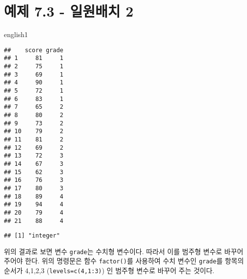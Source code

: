 \documentclass[
]{book}
\newenvironment{Shaded}{\begin{snugshade}}{\end{snugshade}}
\newcommand{\AttributeTok}[1]{\textcolor[rgb]{0.77,0.63,0.00}{#1}}
\newcommand{\DecValTok}[1]{\textcolor[rgb]{0.00,0.00,0.81}{#1}}
\newcommand{\FunctionTok}[1]{\textcolor[rgb]{0.00,0.00,0.00}{#1}}
\newcommand{\NormalTok}[1]{#1}
\newcommand{\OtherTok}[1]{\textcolor[rgb]{0.56,0.35,0.01}{#1}}
\newcommand{\SpecialCharTok}[1]{\textcolor[rgb]{0.00,0.00,0.00}{#1}}
\newcommand{\StringTok}[1]{\textcolor[rgb]{0.31,0.60,0.02}{#1}}
\begin{document}
\hypertarget{uxc608uxc81c-7.3---uxc77cuxc6d0uxbc30uxce58-2}{%
\section{예제 7.3 - 일원배치 2}\label{uxc608uxc81c-7.3---uxc77cuxc6d0uxbc30uxce58-2}}

\begin{Shaded}
\begin{Highlighting}[]
\NormalTok{english1}
\end{Highlighting}
\end{Shaded}

\begin{verbatim}
##    score grade
## 1     81     1
## 2     75     1
## 3     69     1
## 4     90     1
## 5     72     1
## 6     83     1
## 7     65     2
## 8     80     2
## 9     73     2
## 10    79     2
## 11    81     2
## 12    69     2
## 13    72     3
## 14    67     3
## 15    62     3
## 16    76     3
## 17    80     3
## 18    89     4
## 19    94     4
## 20    79     4
## 21    88     4
\end{verbatim}

\begin{Shaded}
\end{Shaded}

\begin{verbatim}
## [1] "integer"
\end{verbatim}

위의 결과로 보면 변수 \texttt{grade}는 수치형 변수이다. 따라서 이를 범주형 변수로 바꾸어 주어야 한다. 위의 명령문은 함수 \texttt{factor()}를 사용하여 수치 변수인 \texttt{grade}를 항목의 순서가 4,1,2,3 (\texttt{levels=c(4,1:3)}) 인 범주형 변수로 바꾸어 주는 것이다.

\begin{Shaded}
\end{Shaded}
\end{document}
